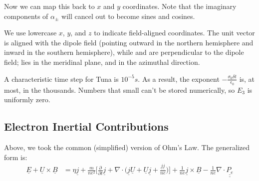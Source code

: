 Now we can map this back to $x$ and $y$ coordinates. Note that the imaginary components of $\alpha_\pm$ will cancel out to become sines and cosines. 




We use lowercase $x$, $y$, and $z$ to indicate field-aligned coordinates. The
unit vector \zhat is aligned with the dipole field (pointing outward in the
northern hemisphere and inward in the southern hemisphere), while \xhat and
\yhat are perpendicular to the dipole field; \xhat lies in the meridinal plane,
and \yhat in the azimuthal direction.

A characteristic time step for Tuna is $10^{-5} s$. As a result, the exponent $- \frac{\sigma_0 \delta t}{\epsilon_0}$ is, at most, in the thousands. Numbers that small can't be stored numerically, so $E_3$ is uniformly zero. 

\subsection{Electron Inertial Contributions}

Above, we took the common (simplified) version of Ohm's Law. The generalized form is:
\begin{align}
  \underline{E} +
  \underline{U} \times \underline{B} & = 
  \eta \underline{j} +
  \frac{m}{n e^2} \Big[
    \frac{\partial}{\partial t} \underline{j} +
    \nabla \cdot \big( \underline{j} \underline{U} +
    \underline{U} \underline{j} +
    \frac{ \underline{j} \underline{j} }{n e} \big) 
  \Big] +
  \frac{1}{n e} \underline{j} \times \underline{B} -
  \frac{1}{n e} \nabla \cdot \underline{ \underline{P_e} }
\end{align}

